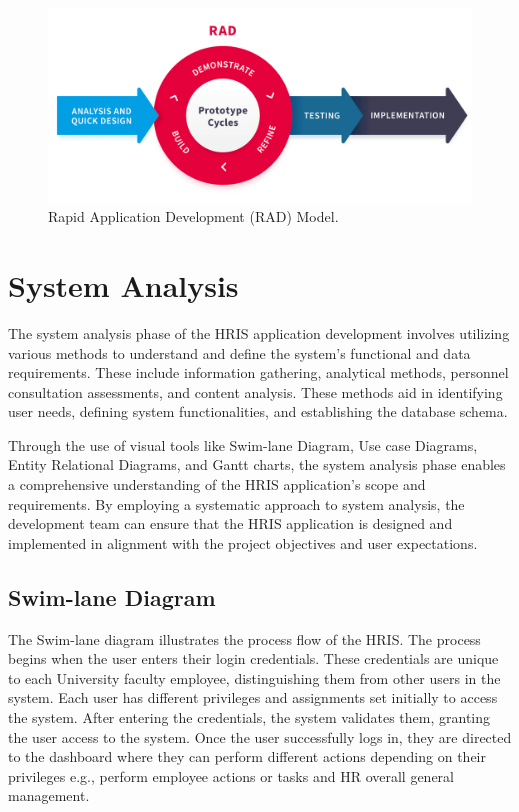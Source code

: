 \begin{figure}[H]
    \centering
    \includegraphics[width=1\linewidth]{figures/images/rad.png}
    \caption{Rapid Application Development (RAD) Model.}
    \label{fig:rad}
\end{figure}
    
\section{System Analysis}
The system analysis phase of the HRIS application development involves utilizing various methods to understand and define the system's functional and data requirements. These include information gathering, analytical methods, personnel consultation assessments, and content analysis. These methods aid in identifying user needs, defining system functionalities, and establishing the database schema. 

Through the use of visual tools like Swim-lane Diagram, Use case Diagrams, Entity Relational Diagrams, and Gantt charts, the system analysis phase enables a comprehensive understanding of the HRIS application's scope and requirements. By employing a systematic approach to system analysis, the development team can ensure that the HRIS application is designed and implemented in alignment with the project objectives and user expectations.

    \subsection{Swim-lane Diagram}
    The Swim-lane diagram illustrates the process flow of the HRIS. The process begins when the user enters their login credentials. These credentials are unique to each University faculty employee, distinguishing them from other users in the system. Each user has different privileges and assignments set initially to access the system. After entering the credentials, the system validates them, granting the user access to the system. Once the user successfully logs in, they are directed to the dashboard where they can perform different actions depending on their privileges e.g., perform employee actions or tasks and HR overall general management.

